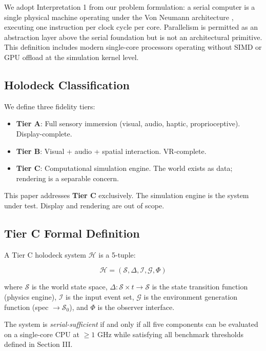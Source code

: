 \documentclass[conference]{IEEEtran}
\begin{document}
We adopt Interpretation 1 from our problem formulation: a serial computer is a
single physical machine operating under the Von Neumann architecture
\cite{vonneumann1945}, executing one instruction per clock cycle per core. Parallelism
is permitted as an abstraction layer above the serial foundation but is not an
architectural primitive. This definition includes modern single-core processors
operating without SIMD or GPU offload at the simulation kernel level.

\subsection{Holodeck Classification}

We define three fidelity tiers:

\begin{itemize}
    \item \textbf{Tier A}: Full sensory immersion (visual, audio, haptic,
          proprioceptive). Display-complete.
    \item \textbf{Tier B}: Visual + audio + spatial interaction. VR-complete.
    \item \textbf{Tier C}: Computational simulation engine. The world exists as
          data; rendering is a separable concern.
\end{itemize}

This paper addresses \textbf{Tier C} exclusively. The simulation engine is the
system under test. Display and rendering are out of scope.

\subsection{Tier C Formal Definition}

A Tier C holodeck system $\mathcal{H}$ is a 5-tuple:

\begin{equation}
    \mathcal{H} = (\mathcal{S}, \Delta, \mathcal{I}, \mathcal{G}, \Phi)
\end{equation}

where $\mathcal{S}$ is the world state space, $\Delta: \mathcal{S} \times t
\rightarrow \mathcal{S}$ is the state transition function (physics engine),
$\mathcal{I}$ is the input event set, $\mathcal{G}$ is the environment generation
function (spec $\rightarrow \mathcal{S}_0$), and $\Phi$ is the observer interface.

The system is \textit{serial-sufficient} if and only if all five components can
be evaluated on a single-core CPU at $\geq 1$ GHz while satisfying all benchmark
thresholds defined in Section III.
\end{document}
